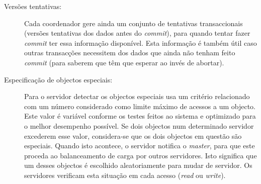 \begin{description}
\item[Versões tentativas:]
Cada coordenador gere ainda um conjunto de tentativas transaccionais (versões tentativas dos dados antes do \textit{commit}), para quando tentar fazer \textit{commit} ter essa informação disponível. Esta informação é também útil caso outras transacções necessitem dos dados que ainda não tenham feito \textit{commit} (para saberem que têm que esperar ao invés de abortar).

\item[Especificação de objectos especiais:]
Para o servidor detectar os objectos especiais usa um critério relacionado com um número considerado como limite máximo de acessos a um objecto. Este valor é variável conforme os testes feitos ao sistema e optimizado para o melhor desempenho possível. Se dois objectos num determinado servidor excederem esse valor, considera-se que os dois objectos em questão são especiais. Quando isto acontece, o servidor notifica o \textit{master}, para que este proceda ao balanceamento de carga por outros servidores. Isto significa que um desses objectos é escolhido aleatoriamente para mudar de servidor. Os servidores verificam esta situação em cada acesso (\textit{read} ou \textit{write}).

\end{description}